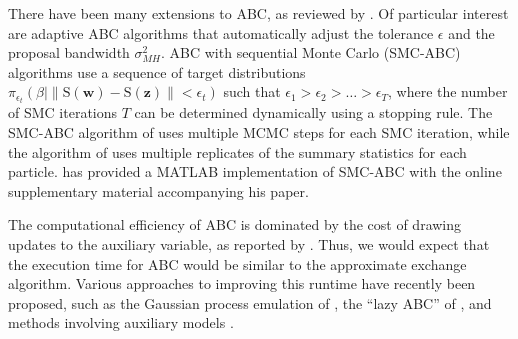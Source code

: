 \documentclass[nojss,shortnames]{jss}\usepackage[]{graphicx}\usepackage[]{color}
\begin{document}
There have been many extensions to ABC, as reviewed by \citet{Marin2012}. Of particular interest are adaptive ABC algorithms that automatically adjust the tolerance $\epsilon$ and the proposal bandwidth $\sigma^2_{MH}$. ABC with sequential Monte Carlo (SMC-ABC) algorithms use a sequence of target distributions $\pi_{\epsilon_t} \left(\beta \mid \| \mathrm{S}(\mathbf{w}) - \mathrm{S}(\mathbf{z}) \| < \epsilon_t \right)$ such that $\epsilon_1 > \epsilon_2 > \dots > \epsilon_T$, where the number of SMC iterations $T$ can be determined dynamically using a stopping rule. The SMC-ABC algorithm of \citet{Drovandi2011} uses multiple MCMC steps for each SMC iteration, while the algorithm of \citet{DelMoral2012} uses multiple replicates of the summary statistics for each particle. \citet{Everitt2012} has provided a MATLAB implementation of SMC-ABC with the online supplementary material accompanying his paper.

The computational efficiency of ABC is dominated by the cost of drawing updates to the auxiliary variable, as reported by \citet{Everitt2012}. Thus, we would expect that the execution time for ABC would be similar to the approximate exchange algorithm. Various approaches to improving this runtime have recently been proposed, such as the Gaussian process emulation of \citet{Wilkinson2014}, the ``lazy ABC'' of \citet{Prangle2014}, and methods involving auxiliary models \citep{Cabras2014,Moores2014,Buzbas2015}.


\end{document}
